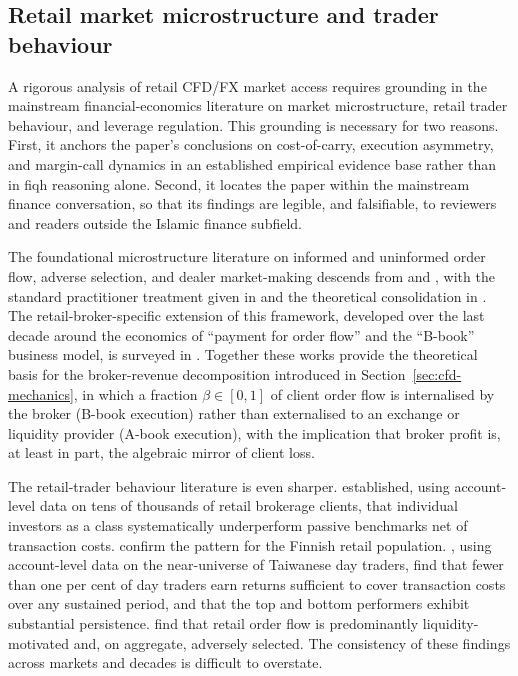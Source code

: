 \documentclass[preprint,12pt,authoryear]{elsarticle}
\theoremstyle{definition}
\begin{document}
\subsection{Retail market microstructure and trader behaviour}
\label{sec:lit-microstructure}

A rigorous analysis of retail CFD/FX market access requires grounding
in the mainstream financial-economics literature on market
microstructure, retail trader behaviour, and leverage regulation. This
grounding is necessary for two reasons. First, it anchors the paper's
conclusions on cost-of-carry, execution asymmetry, and margin-call
dynamics in an established empirical evidence base rather than in fiqh
reasoning alone. Second, it locates the paper within the mainstream
finance conversation, so that its findings are legible, and
falsifiable, to reviewers and readers outside the Islamic finance
subfield.

The foundational microstructure literature on informed and uninformed
order flow, adverse selection, and dealer market-making descends from
\citet{Kyle1985} and \citet{GlostenMilgrom1985}, with the standard
practitioner treatment given in \citet{Harris2003} and the theoretical
consolidation in \citet{OHara1995}. The retail-broker-specific
extension of this framework, developed over the last decade around the
economics of ``payment for order flow'' and the ``B-book'' business
model, is surveyed in \citet{Menkveld2016}. Together these works
provide the theoretical basis for the broker-revenue decomposition
introduced in Section~\ref{sec:cfd-mechanics}, in which a fraction
$\beta \in [0,1]$ of client order flow is internalised by the broker
(B-book execution) rather than externalised to an exchange or
liquidity provider (A-book execution), with the implication that
broker profit is, at least in part, the algebraic mirror of client
loss.

The retail-trader behaviour literature is even sharper.
\citet{BarberOdean2000, BarberOdean2013} established, using
account-level data on tens of thousands of retail brokerage clients,
that individual investors as a class systematically underperform
passive benchmarks net of transaction costs. \citet{GrinblattKeloharju2000}
confirm the pattern for the Finnish retail population.
\citet{Barber2014Taiwan}, using account-level data on the near-universe
of Taiwanese day traders, find that fewer than one per cent of day
traders earn returns sufficient to cover transaction costs over any
sustained period, and that the top and bottom performers exhibit
substantial persistence. \citet{KelleyTetlock2013} find that retail
order flow is predominantly liquidity-motivated and, on aggregate,
adversely selected. The consistency of these findings across markets
and decades is difficult to overstate.
\end{document}
